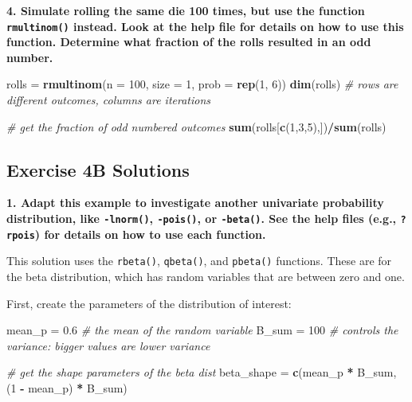 \documentclass[]{book}
\newenvironment{Shaded}{\begin{snugshade}}{\end{snugshade}}
\newcommand{\CommentTok}[1]{\textcolor[rgb]{0.56,0.35,0.01}{\textit{#1}}}
\newcommand{\DataTypeTok}[1]{\textcolor[rgb]{0.13,0.29,0.53}{#1}}
\newcommand{\DecValTok}[1]{\textcolor[rgb]{0.00,0.00,0.81}{#1}}
\newcommand{\FloatTok}[1]{\textcolor[rgb]{0.00,0.00,0.81}{#1}}
\newcommand{\KeywordTok}[1]{\textcolor[rgb]{0.13,0.29,0.53}{\textbf{#1}}}
\newcommand{\NormalTok}[1]{#1}
\newcommand{\OperatorTok}[1]{\textcolor[rgb]{0.81,0.36,0.00}{\textbf{#1}}}
\newcommand{\StringTok}[1]{\textcolor[rgb]{0.31,0.60,0.02}{#1}}
\begin{document}
\textbf{4. Simulate rolling the same die 100 times, but use the function \texttt{rmultinom()} instead. Look at the help file for details on how to use this function. Determine what fraction of the rolls resulted in an odd number.}

\begin{Shaded}
\begin{Highlighting}[]
\NormalTok{rolls =}\StringTok{ }\KeywordTok{rmultinom}\NormalTok{(}\DataTypeTok{n =} \DecValTok{100}\NormalTok{, }\DataTypeTok{size =} \DecValTok{1}\NormalTok{, }\DataTypeTok{prob =} \KeywordTok{rep}\NormalTok{(}\DecValTok{1}\NormalTok{, }\DecValTok{6}\NormalTok{))}
\KeywordTok{dim}\NormalTok{(rolls) }\CommentTok{#  rows are different outcomes, columns are iterations}

\CommentTok{# get the fraction of odd numbered outcomes}
\KeywordTok{sum}\NormalTok{(rolls[}\KeywordTok{c}\NormalTok{(}\DecValTok{1}\NormalTok{,}\DecValTok{3}\NormalTok{,}\DecValTok{5}\NormalTok{),])}\OperatorTok{/}\KeywordTok{sum}\NormalTok{(rolls)}
\end{Highlighting}
\end{Shaded}

\hypertarget{ex4b-answers}{%
\subsection*{Exercise 4B Solutions}\label{ex4b-answers}}

\textbf{1. Adapt this example to investigate another univariate probability distribution, like \texttt{-lnorm()}, \texttt{-pois()}, or \texttt{-beta()}. See the help files (e.g., \texttt{?rpois}) for details on how to use each function.}

This solution uses the \texttt{rbeta()}, \texttt{qbeta()}, and \texttt{pbeta()} functions. These are for the beta distribution, which has random variables that are between zero and one.

First, create the parameters of the distribution of interest:

\begin{Shaded}
\begin{Highlighting}[]
\NormalTok{mean_p =}\StringTok{ }\FloatTok{0.6}  \CommentTok{# the mean of the random variable}
\NormalTok{B_sum =}\StringTok{ }\DecValTok{100}   \CommentTok{# controls the variance: bigger values are lower variance}

\CommentTok{# get the shape parameters of the beta dist}
\NormalTok{beta_shape =}\StringTok{ }\KeywordTok{c}\NormalTok{(mean_p }\OperatorTok{*}\StringTok{ }\NormalTok{B_sum, (}\DecValTok{1} \OperatorTok{-}\StringTok{ }\NormalTok{mean_p) }\OperatorTok{*}\StringTok{ }\NormalTok{B_sum)}
\end{Highlighting}
\end{Shaded}
\end{document}
